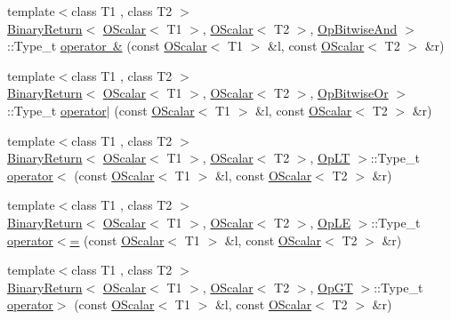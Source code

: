 \begin{DoxyCompactItemize}
{\footnotesize template$<$class T1 , class T2 $>$ }\\\mbox{\hyperlink{structENSEM_1_1BinaryReturn}{Binary\+Return}}$<$ \mbox{\hyperlink{classENSEM_1_1OScalar}{O\+Scalar}}$<$ T1 $>$, \mbox{\hyperlink{classENSEM_1_1OScalar}{O\+Scalar}}$<$ T2 $>$, \mbox{\hyperlink{structENSEM_1_1OpBitwiseAnd}{Op\+Bitwise\+And}} $>$\+::Type\+\_\+t \mbox{\hyperlink{group__obsscalar_ga0ce8b28e6efb00e905152096020cfafe}{operator \&}} (const \mbox{\hyperlink{classENSEM_1_1OScalar}{O\+Scalar}}$<$ T1 $>$ \&l, const \mbox{\hyperlink{classENSEM_1_1OScalar}{O\+Scalar}}$<$ T2 $>$ \&r)
\item 
{\footnotesize template$<$class T1 , class T2 $>$ }\\\mbox{\hyperlink{structENSEM_1_1BinaryReturn}{Binary\+Return}}$<$ \mbox{\hyperlink{classENSEM_1_1OScalar}{O\+Scalar}}$<$ T1 $>$, \mbox{\hyperlink{classENSEM_1_1OScalar}{O\+Scalar}}$<$ T2 $>$, \mbox{\hyperlink{structENSEM_1_1OpBitwiseOr}{Op\+Bitwise\+Or}} $>$\+::Type\+\_\+t \mbox{\hyperlink{group__obsscalar_ga9243675542e15046a4e7b9f570ba66d1}{operator$\vert$}} (const \mbox{\hyperlink{classENSEM_1_1OScalar}{O\+Scalar}}$<$ T1 $>$ \&l, const \mbox{\hyperlink{classENSEM_1_1OScalar}{O\+Scalar}}$<$ T2 $>$ \&r)
\item 
{\footnotesize template$<$class T1 , class T2 $>$ }\\\mbox{\hyperlink{structENSEM_1_1BinaryReturn}{Binary\+Return}}$<$ \mbox{\hyperlink{classENSEM_1_1OScalar}{O\+Scalar}}$<$ T1 $>$, \mbox{\hyperlink{classENSEM_1_1OScalar}{O\+Scalar}}$<$ T2 $>$, \mbox{\hyperlink{structENSEM_1_1OpLT}{Op\+LT}} $>$\+::Type\+\_\+t \mbox{\hyperlink{group__obsscalar_gaf1a8a81f23c6d685296f296827d2a4f0}{operator$<$}} (const \mbox{\hyperlink{classENSEM_1_1OScalar}{O\+Scalar}}$<$ T1 $>$ \&l, const \mbox{\hyperlink{classENSEM_1_1OScalar}{O\+Scalar}}$<$ T2 $>$ \&r)
\item 
{\footnotesize template$<$class T1 , class T2 $>$ }\\\mbox{\hyperlink{structENSEM_1_1BinaryReturn}{Binary\+Return}}$<$ \mbox{\hyperlink{classENSEM_1_1OScalar}{O\+Scalar}}$<$ T1 $>$, \mbox{\hyperlink{classENSEM_1_1OScalar}{O\+Scalar}}$<$ T2 $>$, \mbox{\hyperlink{structENSEM_1_1OpLE}{Op\+LE}} $>$\+::Type\+\_\+t \mbox{\hyperlink{group__obsscalar_gaf2d22d4258136c38dba73b6d210b7048}{operator$<$=}} (const \mbox{\hyperlink{classENSEM_1_1OScalar}{O\+Scalar}}$<$ T1 $>$ \&l, const \mbox{\hyperlink{classENSEM_1_1OScalar}{O\+Scalar}}$<$ T2 $>$ \&r)
\item 
{\footnotesize template$<$class T1 , class T2 $>$ }\\\mbox{\hyperlink{structENSEM_1_1BinaryReturn}{Binary\+Return}}$<$ \mbox{\hyperlink{classENSEM_1_1OScalar}{O\+Scalar}}$<$ T1 $>$, \mbox{\hyperlink{classENSEM_1_1OScalar}{O\+Scalar}}$<$ T2 $>$, \mbox{\hyperlink{structENSEM_1_1OpGT}{Op\+GT}} $>$\+::Type\+\_\+t \mbox{\hyperlink{group__obsscalar_ga8a16530cd60ff38f2be9575251898ac2}{operator$>$}} (const \mbox{\hyperlink{classENSEM_1_1OScalar}{O\+Scalar}}$<$ T1 $>$ \&l, const \mbox{\hyperlink{classENSEM_1_1OScalar}{O\+Scalar}}$<$ T2 $>$ \&r)

\end{DoxyCompactItemize}
